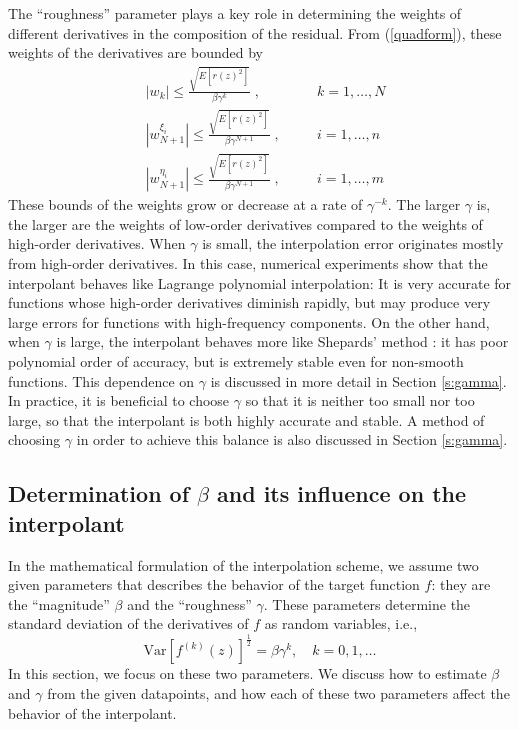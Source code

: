 The ``roughness'' parameter plays a key role in determining the weights
of different derivatives in the composition of the residual.
From (\ref{quadform}), these weights of the derivatives are bounded by
\[\begin{aligned}
 &|w_k| \le \frac{\displaystyle\sqrt{E\left[r(z)^2\right]}}{\beta\gamma^k}\;,
  && \quad k = 1,\ldots, N \\
 & |w_{N+1}^{\xi_i}| \le 
  \frac{\displaystyle\sqrt{E\left[r(z)^2\right]}}{\beta\gamma^{N+1}}\;,
  && \quad i = 1,\ldots,n \\
 & |w_{N+1}^{\eta_i}| \le 
  \frac{\displaystyle\sqrt{E\left[r(z)^2\right]}}{\beta\gamma^{N+1}}\;,
  && \quad i = 1,\ldots,m
\end{aligned} \]
These bounds of the weights grow or decrease at a rate of $\gamma^{-k}$.
The larger $\gamma$ is, the larger are the weights of low-order derivatives
compared to the weights of high-order derivatives.  When $\gamma$ is small, 
the interpolation error originates mostly from high-order derivatives.
In this case,
numerical experiments show that the interpolant behaves like Lagrange
polynomial interpolation:  It is very accurate for functions whose high-order
derivatives diminish rapidly, but may produce very large errors for functions
with high-frequency components.  On the other hand, when $\gamma$ is large,
the interpolant behaves more like Shepards' method \cite[]{shepard}:
it has poor polynomial
order of accuracy, but is extremely stable even for non-smooth functions.
This dependence on $\gamma$ is discussed in more detail in Section
\ref{s:gamma}.
In practice, it is beneficial to choose $\gamma$ so that it is neither too
small nor too large, so that the interpolant is both highly accurate and
stable.  A method of choosing $\gamma$ in order to achieve this balance is
also discussed in Section \ref{s:gamma}.



\subsection{Determination of $\beta$ and its influence on
            the interpolant} \label{s:beta}
In the mathematical formulation of the interpolation scheme, we assume two
given parameters that describes the behavior of the target function $f$:
they are the ``magnitude'' $\beta$ and the ``roughness'' $\gamma$.
These parameters determine the standard deviation of the derivatives of $f$
as random variables, i.e.,
\begin{equation} \label{model}
\mathrm{Var} \left[ f^{(k)}(z) \right]^{\frac12}
 = \beta \gamma^k, \quad k = 0,1,\ldots
\end{equation}
In this section, we focus on these two parameters.  We discuss how to estimate
$\beta$ and $\gamma$ from the given datapoints, and how each of these two
parameters affect the behavior of the interpolant.

